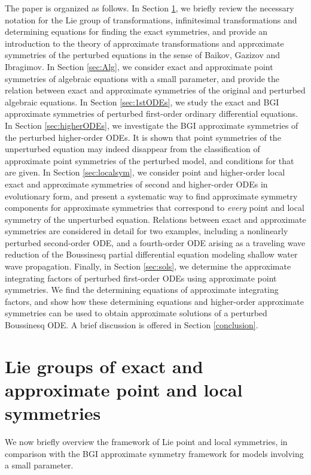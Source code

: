 \documentclass[11pt,letter,subeqn]{article}
\begin{document}
The paper is organized as follows. In Section \ref{sec:PAs}, we briefly review the necessary notation for the Lie group of transformations, infinitesimal transformations and determining equations for finding the exact symmetries, and provide an introduction to the theory of approximate
transformations and approximate symmetries of the perturbed equations in the sense of Baikov, Gazizov and Ibragimov. In Section \ref{sec:Alg}, we consider exact and approximate point symmetries of algebraic equations with a small parameter, and provide the relation between exact and approximate symmetries of the original and perturbed algebraic equations. In Section \ref{sec:1stODEs}, we study the exact and BGI approximate symmetries of perturbed first-order ordinary differential equations. In Section \ref{sec:higherODEs}, we investigate the BGI approximate symmetries of the perturbed higher-order ODEs. It is shown that point symmetries of the unperturbed equation may indeed disappear from the classification of approximate point symmetries of the perturbed model, and conditions for that are given. In Section \ref{sec:localsym}, we consider point and higher-order local exact and approximate symmetries of second and higher-order ODEs in evolutionary form, and present a systematic way to find approximate symmetry components for approximate symmetries that correspond to \emph{every} point and local symmetry of the unperturbed equation. Relations between exact and approximate symmetries are considered in detail for two examples, including a nonlinearly perturbed second-order ODE, and a fourth-order ODE arising as a traveling wave reduction of the Boussinesq partial differential equation modeling  shallow water wave propagation. Finally, in Section \ref{sec:sols}, we determine the approximate integrating factors of perturbed first-order ODEs using approximate point symmetries. We find the determining equations of approximate integrating factors, and show how these determining equations and higher-order approximate symmetries can be used to obtain approximate solutions of a perturbed Boussinesq ODE. A brief discussion is offered in Section \ref{conclusion}.


\section{Lie groups of exact and approximate point and local symmetries}\label{sec:PAs}

We now briefly overview the framework of Lie point and local symmetries, in comparison with the BGI approximate symmetry framework \cite{baikov1989, baikov1991, baikov1993} for models involving a small parameter.
\end{document}
